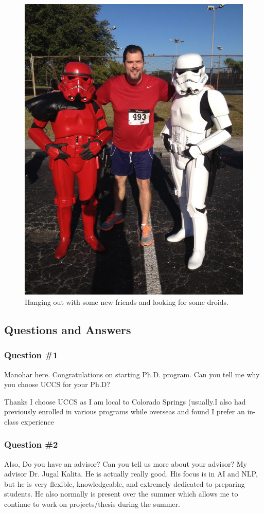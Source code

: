 \begin{figure}
	\centering
	\caption{Hanging out with some new friends and looking for some droids.}
	\label{fig:PaulsonLittleTall}
	\includegraphics[width=0.7\linewidth]{PaulsonLittleTall}
\end{figure}

    \subsection{Questions and Answers}
    \subsubsection {Question \#1}
		Manohar here. Congratulations on starting Ph.D. program. Can you tell me why you choose UCCS for your Ph.D?
		
		Thanks I choose UCCS as I am local to Colorado Springs (usually.I also had previously enrolled in various programs while overseas and found I prefer an in-class experience 

    \subsubsection {Question \#2}

	Also, Do you have an advisor? Can you tell us more about your advisor?
    My advisor Dr. Jugal Kalita.  He is actually really good.  His focus is in AI and NLP, but he is very flexible, knowledgeable, and extremely dedicated to preparing students.  He also normally is present over the summer which allows me to continue to work on projects/thesis during the summer.
